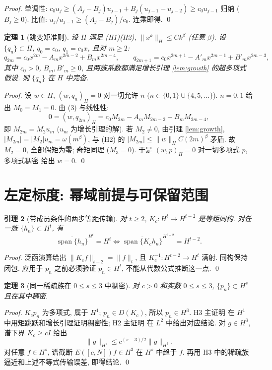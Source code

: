 \documentclass[UTF8]{ctexart}
\newtheorem{theorem}{定理}[section]
\newtheorem{lemma}[theorem]{引理}
\begin{document}
\begin{proof}
	单调性: $c_0 u_j \geq (A_j - B_j)u_{j-1} + B_j(u_{j-1} - u_{j-2})
	\geq c_0 u_{j-1}$ 归纳 ($B_j \geq 0$). 比值: $u_j/u_{j-1}
	\geq (A_j - B_j)/c_0$. 连乘即得. \qed
\end{proof}

\begin{theorem}[跳变矩准则]\label{thm:jump}
	设 $H$ 满足 (H1)(H2), $\|x^k\|_H \leq C k^\beta$ (任意 $\beta$).
	设 $\{q_n\} \subset \Pi$, $q_0 = c_0$, $q_1 = c_0 x$, 且对 $m \geq 2$:
	\begin{equation}
		q_{2m} = c_0 x^{2m} - A_m x^{2m-2} + B_m x^{2m-4}, \qquad
		q_{2m+1} = c_0 x^{2m+1} - A'_m x^{2m-1} + B'_m x^{2m-3},
	\end{equation}
	其中 $c_0 > 0$, $B_m, B'_m \geq 0$, 且两族系数都满足增长引理 \ref{lem:growth} 的超多项式
	假设. 则 $\{q_n\}$ 在 $H$ 中完备.
\end{theorem}

\begin{proof}
	设 $w \in H$, $(w, q_n)_H = 0$ 对一切允许 $n$ ($n \in \{0,1\} \cup
	\{4,5,\dots\}$). $n=0,1$ 给出 $M_0 = M_1 = 0$. 由 (3) 与线性性:
	\[
		0 = (w, q_{2m})_H = c_0 M_{2m} - A_m M_{2m-2} + B_m M_{2m-4},
	\]
	即 $M_{2m} = M_2 u_m$ ($u_m$ 为增长引理的解). 若 $M_2 \neq 0$, 由引理 \ref{lem:growth},
	$|M_{2m}| = |M_2| u_m = \omega(m^\beta)$, 与 (H2) 的
	$|M_{2m}| \leq \|w\|_H C (2m)^\beta$ 矛盾. 故 $M_2 = 0$, 全部偶矩为零;
	奇矩同理 ($M_3 = 0$). 于是 $(w, p)_H = 0$ 对一切多项式 $p$, 多项式稠密
	给出 $w = 0$. \qed
\end{proof}

\section{左定标度: 幂域前提与可保留范围}\label{sec:left-scale}

\begin{lemma}[带成员条件的两步等距传输]
对 $t\ge2$, $K_c:H^t\to H^{t-2}$ 是等距同构.
对任一族 $\{h_n\}\subset H^t$, 有
\[
 \overline{\operatorname{span}\{h_n\}}^{H^t}=H^t
 \iff \overline{\operatorname{span}\{K_ch_n\}}^{H^{t-2}}=H^{t-2}.
\]
\end{lemma}
\begin{proof}
泛函演算给出 $\|K_cf\|_{t-2}=\|f\|_t$,
且 $K_c^{-1}:H^{t-2}\to H^t$ 满射. 同构保持闭包.
应用于 $p_n$ 之前必须验证 $p_n\in H^t$, 不能从代数公式推断这一点. \qed
\end{proof}

\begin{theorem}[同一稀疏族在 $0\le s\le3$ 中稠密]\label{thm:low-order}
对 $c>0$ 和实数 $0\le s\le3$, $\{p_n\}\subset H^s$ 且在其中稠密.
\end{theorem}
\begin{proof}
$K_cp_n$ 为多项式, 属于 $H^1$; $p_n\in D(K_c)$, 所以 $p_n\in H^3$.
H3 主证明 \cite{h3proof} 在 $H^1$ 中用矩跳跃和增长引理证明稠密性;
H2 主证明 \cite{h2proof} 在 $L^2$ 中给出对应结论.
对 $g\in H^3$, 谱下界 $K_c\ge cI$ 给出
\[
 \|g\|_{H^s}\le c^{(s-3)/2}\|g\|_{H^3}.
\]
对任意 $f\in H^s$, 谱截断 $E([c,N])f\in H^3$ 在 $H^s$ 中趋于 $f$.
再用 H3 中的稀疏族逼近和上述不等式传输误差, 即得结论. \qed
\end{proof}
\end{document}
